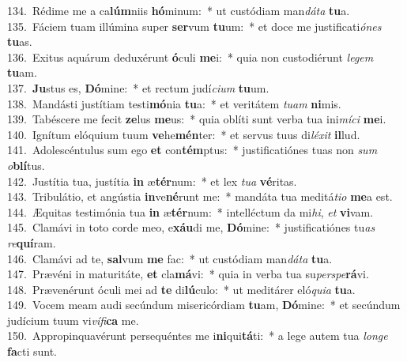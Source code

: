 {134.~}Rédime me a ca\textbf{lúm}niis \textbf{hó}minum:~* ut custódiam man\textit{dá}\textit{ta} \textbf{tu}a.\\
{135.~}Fáciem tuam illúmina super \textbf{ser}vum \textbf{tu}um:~* et doce me justificati\textit{ó}\textit{nes} \textbf{tu}as.\\
{136.~}Exitus aquárum deduxérunt \textbf{ó}culi \textbf{me}i:~* quia non custodiérunt \textit{le}\textit{gem} \textbf{tu}am.\\
{137.~}\textbf{Ju}stus es, \textbf{Dó}mine:~* et rectum judí\textit{ci}\textit{um} \textbf{tu}um.\\
{138.~}Mandásti justítiam testi\textbf{mó}nia \textbf{tu}a:~* et veritátem \textit{tu}\textit{am} \textbf{ni}mis.\\
{139.~}Tabéscere me fecit \textbf{ze}lus \textbf{me}us:~* quia oblíti sunt verba tua ini\textit{mí}\textit{ci} \textbf{me}i.\\
{140.~}Ignítum elóquium tuum \textbf{ve}he\textbf{mén}ter:~* et servus tuus di\textit{lé}\textit{xit} \textbf{il}lud.\\
{141.~}Adolescéntulus sum ego \textbf{et} con\textbf{tém}ptus:~* justificatiónes tuas non \textit{sum} \textit{o}\textbf{blí}tus.\\
{142.~}Justítia tua, justítia \textbf{in} æ\textbf{tér}num:~* et lex \textit{tu}\textit{a} \textbf{vé}ritas.\\
{143.~}Tribulátio, et angústia \textbf{in}ve\textbf{né}runt me:~* mandáta tua meditá\textit{ti}\textit{o} \textbf{me}a est.\\
{144.~}Æquitas testimónia tua \textbf{in} æ\textbf{tér}num:~* intelléctum da mi\textit{hi}, \textit{et} \textbf{vi}vam.\\
{145.~}Clamávi in toto corde meo, e\textbf{xáu}di me, \textbf{Dó}mine:~* justificatiónes tu\textit{as} \textit{re}\textbf{quí}ram.\\
{146.~}Clamávi ad te, \textbf{sal}vum \textbf{me} fac:~* ut custódiam man\textit{dá}\textit{ta} \textbf{tu}a.\\
{147.~}Prævéni in maturitáte, \textbf{et} cla\textbf{má}vi:~* quia in verba tua su\textit{per}\textit{spe}\textbf{rá}vi.\\
{148.~}Prævenérunt óculi mei ad \textbf{te} di\textbf{lú}culo:~* ut meditárer eló\textit{qui}\textit{a} \textbf{tu}a.\\
{149.~}Vocem meam audi secúndum misericórdiam \textbf{tu}am, \textbf{Dó}mine:~* et secúndum judícium tuum vi\textit{ví}\textit{fi}\textbf{ca} me.\\
{150.~}Appropinquavérunt persequéntes me i\textbf{ni}qui\textbf{tá}ti:~* a lege autem tua \textit{lon}\textit{ge} \textbf{fa}cti sunt.\\
